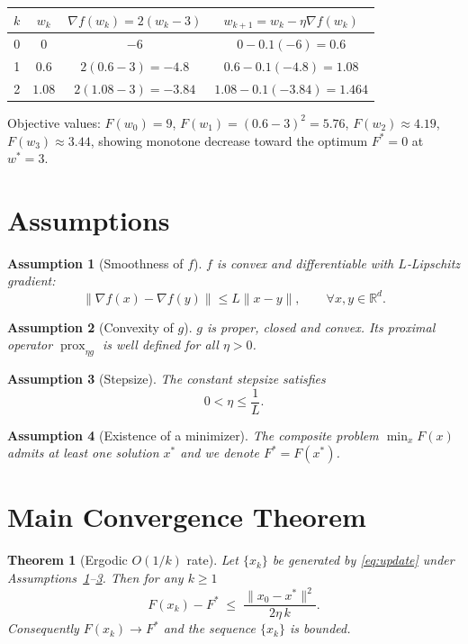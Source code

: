 \documentclass{article}
\newtheorem{theorem}{Theorem}
\newtheorem{assumption}{Assumption}
\newcommand{\prox}{\operatorname{prox}}
\newcommand{\R}{\mathbb{R}}
\begin{document}
\begin{center}
\begin{tabular}{c|c|c|c}
$k$ & $w_{k}$ & $\nabla f(w_{k})=2(w_{k}-3)$ & $w_{k+1}=w_{k}-\eta\nabla f(w_{k})$\\\hline
0 & $0$ & $-6$ & $0-0.1(-6)=0.6$\\
1 & $0.6$ & $2(0.6-3)=-4.8$ & $0.6-0.1(-4.8)=1.08$\\
2 & $1.08$ & $2(1.08-3)=-3.84$ & $1.08-0.1(-3.84)=1.464$\\
\end{tabular}
\end{center}
Objective values: $F(w_{0})=9$, $F(w_{1})=(0.6-3)^{2}=5.76$, $F(w_{2})\approx4.19$, $F(w_{3})\approx3.44$,
showing monotone decrease toward the optimum $F^{*}=0$ at $w^{*}=3$.

\newpage

\section*{Assumptions}
\begin{assumption}[Smoothness of $f$]\label{ass:smooth}
$f$ is convex and differentiable with $L$‑Lipschitz gradient:
\[
\|\nabla f(x)-\nabla f(y)\|\le L\|x-y\|,\qquad\forall x,y\in\R^{d}.
\]
\end{assumption}
\begin{assumption}[Convexity of $g$]\label{ass:convexg}
$g$ is proper, closed and convex. Its proximal operator $\prox_{\eta g}$ is well defined for all $\eta>0$.
\end{assumption}
\begin{assumption}[Stepsize]\label{ass:stepsize}
The constant stepsize satisfies
\[
0<\eta\le\frac{1}{L}.
\]
\end{assumption}
\begin{assumption}[Existence of a minimizer]\label{ass:opt}
The composite problem $\min_{x}F(x)$ admits at least one solution $x^{*}$ and we denote $F^{*}=F(x^{*})$.
\end{assumption}

\section*{Main Convergence Theorem}
\begin{theorem}[Ergodic $O(1/k)$ rate]\label{thm:rate}
Let $\{x_{k}\}$ be generated by \eqref{eq:update} under Assumptions~\ref{ass:smooth}–\ref{ass:stepsize}. Then for any $k\ge 1$
\[
F(x_{k})-F^{*}\;\le\;\frac{\|x_{0}-x^{*}\|^{2}}{2\eta\,k}.
\]
Consequently $F(x_{k})\to F^{*}$ and the sequence $\{x_{k}\}$ is bounded.
\end{theorem}
\end{document}
